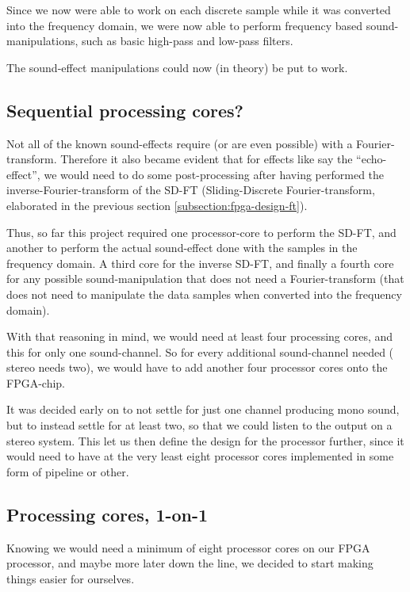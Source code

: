 Since we now were able to work on each discrete sample while it was converted
into the frequency domain, we were now able to perform frequency based
sound-manipulations, such as basic high-pass and low-pass filters.

The sound-effect manipulations could now (in theory) be put to work.

\FloatBarrier
\subsection{Sequential processing cores?}

Not all of the known sound-effects require (or are even possible) with a
Fourier-transform. Therefore it also became evident that for effects like say
the ``echo-effect'', we would need to do some post-processing after having
performed the inverse-Fourier-transform of the SD-FT (Sliding-Discrete
Fourier-transform, elaborated in the previous section
\ref{subsection:fpga-design-ft}).

Thus, so far this project required one processor-core to perform the SD-FT, and
another to perform the actual sound-effect done with the samples in the
frequency domain. A third core for the inverse SD-FT, and finally a fourth core
for any possible sound-manipulation that does not need a Fourier-transform (that
does not need to manipulate the data samples when converted into the frequency
domain).

With that reasoning in mind, we would need at least four processing cores, and
this for only one sound-channel. So for every additional sound-channel needed (
stereo needs two), we would have to add another four processor cores onto the
FPGA-chip.

It was decided early on to not settle for just one channel producing mono sound,
but to instead settle for at least two, so that we could listen to the output
on a stereo system. This let us then define the design for the processor
further, since it would need to have at the very least eight processor cores
implemented in some form of pipeline or other.

\subsection{Processing cores, 1-on-1}

Knowing we would need a minimum of eight processor cores on our FPGA processor,
and maybe more later down the line, we decided to start making things easier
for ourselves.

